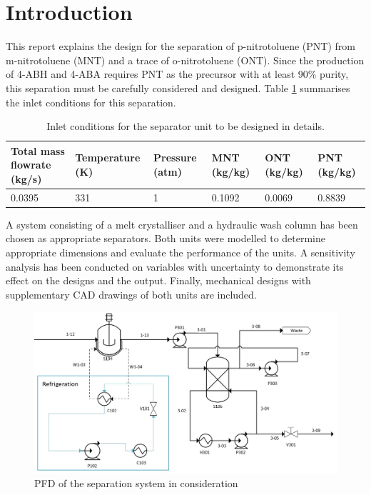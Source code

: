 \section{Introduction}

This report explains the design for the separation of p-nitrotoluene (PNT) from m-nitrotoluene (MNT) and a trace of o-nitrotoluene (ONT). Since the production of 4-ABH and 4-ABA requires PNT as the precursor with at least 90\% purity, this separation must be carefully considered and designed. Table \ref{tab:inlet crystalliser} summarises the inlet conditions for this separation. 

\begin{table}[h] \label{tab:inlet crystalliser}
\centering
\caption{Inlet conditions for the separator unit to be designed in details.}
\begin{tabular}{@{}l|l|l|l|l|l@{}}
\toprule
\textbf{Total mass flowrate (kg/s)}  & \textbf{Temperature (K)}  & \textbf{Pressure (atm)} & \textbf{MNT (kg/kg)} & \textbf{ONT (kg/kg)} & \textbf{PNT (kg/kg)}   \\ \midrule
0.0395  & 331 &  1 & 0.1092 & 0.0069  &   0.8839 \\ \bottomrule
\end{tabular}
\end{table}

A system consisting of a melt crystalliser and a hydraulic wash column has been chosen as appropriate separators. Both units were modelled to determine appropriate dimensions and evaluate the performance of the units. A sensitivity analysis has been conducted on variables with uncertainty to demonstrate its effect on the designs and the output. Finally, mechanical designs with supplementary CAD drawings of both units are included.


\begin{figure}[h]
    \centering
    \includegraphics[scale=0.5]{chapters/3-separation/figures/Crystallizer PFD.jpg}
    \caption{PFD of the separation system in consideration}
    \label{fig:crystalliser schematic}
\end{figure}

